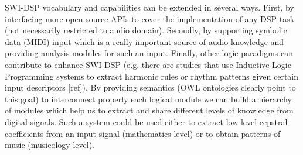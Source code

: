 \documentclass[runningheads]{llncs}
\begin{document}
SWI-DSP vocabulary and capabilities can be extended in several ways. First, by interfacing more open source APIs to cover the implementation of any DSP task (not necessarily restricted to audio domain). Secondly, by supporting symbolic data (MIDI) input which is a really important source of audio knowledge and providing analysis modules for such an input. Finally, other logic paradigms can contribute to enhance SWI-DSP (e.g. there are studies that use Inductive Logic Programming systems to extract harmonic rules or rhythm patterns given certain input descriptors [ref]). By providing semantics (OWL ontologies clearly point to this goal) to interconnect properly each logical module we can build a hierarchy of modules which help us to extract and share different levels of knowledge from digital signals. Such a system could be used either to extract low level cepstral coefficients from an input signal (mathematics level) or to obtain patterns of music (musicology level).
\end{document}
